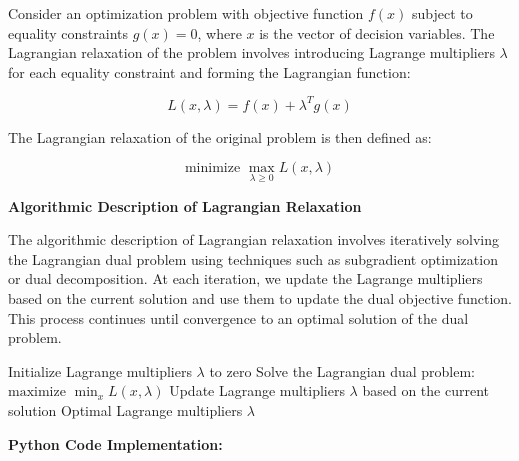 \documentclass[12pt]{book} %
\begin{document}
Consider an optimization problem with objective function \(f(x)\) subject to equality constraints \(g(x) = 0\), where \(x\) is the vector of decision variables. The Lagrangian relaxation of the problem involves introducing Lagrange multipliers \(\lambda\) for each equality constraint and forming the Lagrangian function:

\[
L(x, \lambda) = f(x) + \lambda^T g(x)
\]

The Lagrangian relaxation of the original problem is then defined as:

\[
\text{minimize } \max_{\lambda \geq 0} L(x, \lambda)
\]

\textbf{Algorithmic Description of Lagrangian Relaxation}

The algorithmic description of Lagrangian relaxation involves iteratively solving the Lagrangian dual problem using techniques such as subgradient optimization or dual decomposition. At each iteration, we update the Lagrange multipliers based on the current solution and use them to update the dual objective function. This process continues until convergence to an optimal solution of the dual problem.
\FloatBarrier
\begin{algorithm}
\caption{Lagrangian Relaxation Algorithm}
\begin{algorithmic}[1]
    \State Initialize Lagrange multipliers $\lambda$ to zero
    \Repeat
        \State Solve the Lagrangian dual problem:
        \State \hspace{\algorithmicindent} $\text{maximize } \min_{x} L(x, \lambda)$
        \State Update Lagrange multipliers $\lambda$ based on the current solution
    \State \Return Optimal Lagrange multipliers $\lambda$
\EndFunction
\end{algorithmic}
\end{algorithm}
\FloatBarrier
\textbf{Python Code Implementation:}
\FloatBarrier
\end{document}
